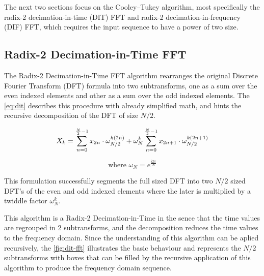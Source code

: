 \documentclass[
  oneside,
  11pt, a4paper,
  footinclude=true,
  headinclude=true,
  cleardoublepage=empty
]{scrbook}
\begin{document}
The next two sections focus on the Cooley–Tukey algorithm, most specifically the radix-2 decimation-in-time (DIT) FFT and radix-2 decimation-in-frequency (DIF) FFT, which requires the input sequence to have a power of two size.


\subsection{Radix-2 Decimation-in-Time FFT} \label{subsec:radix-2-decimation-in-time-fft}


The Radix-2 Decimation-in-Time FFT algorithm rearranges the original Discrete Fourier Transform (DFT) formula into two subtransforms, one as a sum over the even indexed elements and other as a sum over the odd indexed elements. The \autoref{eq:dit} describes this procedure with already simplified math, and hints the recursive decomposition of the DFT of size \(N/2\).

\begin{equation} \label{eq:dit}
    X_{k} = \sum_{n=0}^{\frac{N}{2}-1}x_{2n} \cdot \omega_{N/2}^{k(2n)} + \omega_{N}^{k} \sum_{n=0}^{\frac{N}{2}-1}x_{2n+1} \cdot \omega_{N/2}^{k(2n+1)} \\
\end{equation}

\begin{equation*}
    \text{where } \omega_{N} = e^{\frac{i 2 \pi}{N}}
\end{equation*}

This formulation successfully segments the full sized DFT into two \(N/2\) sized DFT's of the even and odd indexed elements where the later is multiplied by a twiddle factor \( \omega_{N}^{k} \). 

This algorithm is a Radix-2 Decimation-in-Time in the sence that the time values are regrouped in 2 subtransforms, and the decomposition reduces the time values to the frequency domain. Since the understanding of this algorithm can be aplied recursively, the \autoref{fig:dit-fft} illustrates the basic behaviour and represents the \(N/2\) subtransforms with boxes that can be filled by the recursive application of this algorithm to produce the frequency domain sequence.


\end{document}
